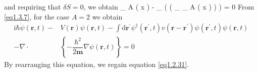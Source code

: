 \ee
and requiring that $\delta S = 0$, we obtain
\be\label{eq1.3.10}
 { \delta \varphi _ { A } ( x ) } - \partial _ { \mu } \left(  { \delta \left( \partial _ { \mu } \varphi _ { A } ( x ) \right) } \right) = 0
\ee
From \eqref{eq1.3.7}, for the case $A = 2$ we obtain
\[
\begin{split} 
\mathrm { i } \hbar \dot { \psi } ( \boldsymbol { r } , t ) - &V ( \boldsymbol { r } ) \psi ( \boldsymbol { r } , t ) - \int \mathrm { d } \boldsymbol { r } ^ { \prime } \psi ^ { \dagger } \left( \boldsymbol { r } ^ { \prime } , t \right) v \left( \boldsymbol { r } - \boldsymbol { r } ^ { \prime } \right) \psi \left( \boldsymbol { r } ^ { \prime } , t \right) \psi ( \boldsymbol { r } , t ) 
 \\  
 - \nabla \cdot & \left\{  - \dfrac { \hbar ^ { 2 } } { 2 \boldsymbol { m } } \nabla \psi ( \boldsymbol { r } , t ) \right\} = 0  \end{split}
\]
By rearranging this equation, we regain equation \eqref{eq1.2.31}.


